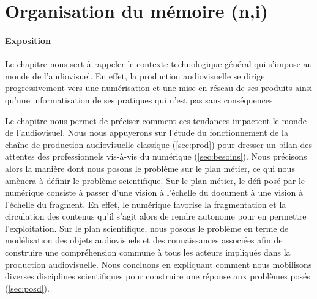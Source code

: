 \section*{Organisation du mémoire (n,i)}\label{sec:plan}

\paragraph{Exposition}

Le chapitre  nous sert à rappeler le contexte technologique général qui s'impose au monde de l'audiovisuel. 
En effet, la production audiovisuelle se dirige progressivement vers une numérisation et une mise en réseau de ses produits ainsi qu'une informatisation de ses pratiques qui n'est pas sans conséquences. 

Le chapitre  nous permet de préciser comment ces tendances impactent le monde de l'audiovisuel.
Nous nous appuyerons sur l'étude du fonctionnement de la chaîne de production audiovisuelle classique (\ref{sec:prod}) pour dresser un bilan des attentes des professionnels vis-à-vis du numérique (\ref{sec:besoins}).
Nous précisons alors la manière dont nous posons le problème sur le plan métier, ce qui nous amènera à définir le problème scientifique. 
Sur le plan métier, le défi posé par le numérique consiste à passer d'une vision à l'échelle du document à une vision à l'échelle du fragment. 
En effet, le numérique favorise la fragmentation et la circulation des contenus qu'il s'agit alors de rendre autonome pour en permettre l'exploitation. 
Sur le plan scientifique, nous posons le problème en terme de modélisation des objets audiovisuels et des connaissances associées afin de construire une compréhension commune à tous les acteurs impliqués dans la production audiovisuelle.
Nous concluons en expliquant comment nous mobilisons diverses disciplines scientifiques pour construire une réponse aux problèmes posés (\ref{sec:posd}).


